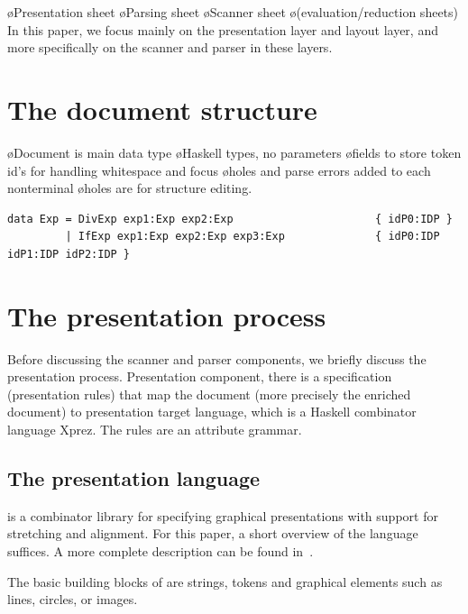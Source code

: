 \documentclass[12pt]{article}
\begin{document}
\bl
\o Presentation sheet
\o Parsing sheet
\o Scanner sheet
\o (evaluation/reduction sheets)
\el
In this paper, we focus mainly on the presentation layer and layout layer, and more specifically on the scanner and parser in these layers.


%
\section{The document structure}
%

\bl
\o Document is main data type
\o Haskell types, no parameters
\o fields to store token id's for handling whitespace and focus
\o holes and parse errors added to each nonterminal
\o holes are for structure editing.
\el

\begin{verbatim}
data Exp = DivExp exp1:Exp exp2:Exp                      { idP0:IDP }
         | IfExp exp1:Exp exp2:Exp exp3:Exp              { idP0:IDP idP1:IDP idP2:IDP }
\end{verbatim}

\section{The presentation process}

Before discussing the scanner and parser components, we briefly discuss the presentation process. Presentation component, there is a specification (presentation rules) that map the document (more precisely the enriched document) to presentation target language, which is a Haskell combinator language Xprez. The rules are an attribute grammar.

%
\subsection{The {\Xprez} presentation language} \label{sect:xprez}
%

\Xprez is a combinator library for specifying graphical presentations with support for stretching and alignment. For this paper, a short overview of the language suffices. A more complete description can be found in~\cite{schrage04Proxima}.

The basic building blocks of \Xprez are strings, tokens and graphical elements such as lines, circles, or images. 
\end{document}
